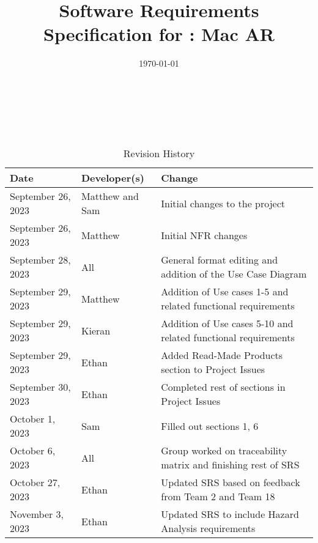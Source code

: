 \documentclass[12pt]{article}
\begin{document}
\title{Software Requirements Specification for \progname: Mac AR}
\author{\authname}
\date{\today}

\maketitle

~\newpage


\tableofcontents

~\newpage

\begin{table}[hp]
	\caption{Revision History} \label{TblRevisionHistory}
	\begin{tabularx}{\textwidth}{llX}
		\toprule
		\textbf{Date}      & \textbf{Developer(s)} & \textbf{Change}                                                                    \\
		\midrule
		September 26, 2023 & Matthew and Sam               & Initial changes to the project                                                             \\
            September 26, 2023 & Matthew & Initial NFR changes \\
            September 28, 2023 & All & General format editing and addition of the Use Case Diagram\\
            September 29, 2023 & Matthew & Addition of Use cases 1-5 and related functional requirements\\
            September 29, 2023 & Kieran & Addition of Use cases 5-10 and related functional requirements\\
            September 29, 2023 & Ethan & Added Read-Made Products section to Project Issues\\
            September 30, 2023 & Ethan & Completed rest of sections in Project Issues\\
            October 1, 2023 & Sam & Filled out sections 1, 6\\
            October 6, 2023 & All & Group worked on traceability matrix and finishing rest of SRS\\  
            October 27, 2023 & Ethan & Updated SRS based on feedback from Team 2 and Team 18\\
            November 3, 2023 & Ethan & Updated SRS to include Hazard Analysis requirements\\
		\bottomrule
	\end{tabularx}
\end{table}
\end{document}
